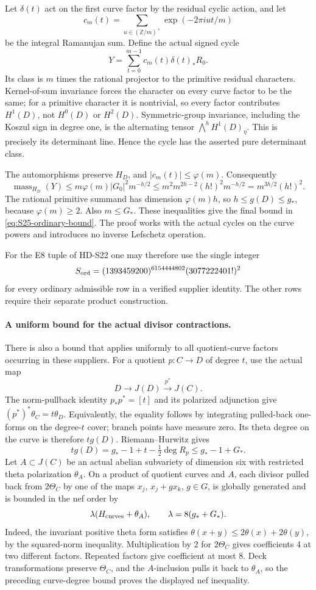 Let \(\delta(t)\) act on the first curve factor by the residual
cyclic action, and let
\[
 c_m(t)=\sum_{u\in(\mathbb Z/m)^\times}
              \exp(-2\pi iut/m)
\]
be the integral Ramanujan sum. Define the actual signed cycle
\[
 Y=\sum_{t=0}^{m-1}c_m(t)\delta(t)_*R_0.
\]
Its class is \(m\) times the rational projector to the primitive
residual characters. Kernel-of-sum invariance forces the character
on every curve factor to be the same; for a primitive character it
is nontrivial, so every factor contributes \(H^1(D)\), not
\(H^0(D)\) or \(H^2(D)\). Symmetric-group invariance, including
the Koszul sign in degree one, is the alternating tensor
\(\bigwedge^h H^1(D)_\eta\). This is precisely its determinant
line. Hence the cycle has the asserted pure determinant class.

The automorphisms preserve \(H_D\), and
\(|c_m(t)|\le\varphi(m)\). Consequently
\[
 \operatorname{mass}_{H_D}(Y)
 \le m\varphi(m)|G_0|^2m^{-h/2}
 \le m^2m^{2h-2}(h!)^2m^{-h/2}
 =m^{3h/2}(h!)^2.
\]
The rational primitive summand has dimension \(\varphi(m)h\), so
\(h\le g(D)\le g_*\), because \(\varphi(m)\ge2\).
Also \(m\le G_*\). These inequalities give the final bound in
\eqref{eq:S25-ordinary-bound}. The proof works with the actual cycles
on the curve powers and introduces no inverse Lefschetz operation.

For the E8 tuple of HD-S22 one may therefore use the single integer
\[
 S_{\rm ord}
 =(1393459200)^{6154444802}(3077222401!)^2
\]
for every ordinary admissible row in a verified supplier identity.
The other rows require their separate product construction.

\paragraph{A uniform bound for the actual divisor contractions.}
There is also a bound that applies uniformly to all quotient-curve
factors occurring in these suppliers. For a quotient \(p:C\to D\)
of degree \(t\), use the actual map
\[
 D\longrightarrow J(D)\xrightarrow{p^*}J(C).
\]
The norm-pullback identity \(p_*p^*=[t]\) and its polarized adjunction
give \((p^*)^*\theta_C=t\theta_D\). Equivalently, the equality
follows by integrating pulled-back one-forms on the degree-\(t\)
cover; branch points have measure zero. Its theta degree on the curve
is therefore \(t g(D)\). Riemann--Hurwitz gives
\[
 t g(D)=g_*-1+t-\tfrac12\deg R_p\le g_*-1+G_*.
\]
Let \(A\subset J(C)\) be an actual abelian subvariety of dimension
six with restricted theta polarization \(\theta_A\). On a product
of quotient curves and \(A\), each divisor pulled back from
\(2\Theta_C\) by one of the maps \(x_j\), \(x_j+g x_k\),
\(g\in G\), is globally generated and is bounded in the nef order
by
\[
 \lambda(H_{\rm curves}+\theta_A),\qquad
 \lambda=8(g_*+G_*).
\]
Indeed, the invariant positive theta form satisfies
\(\theta(x+y)\le2\theta(x)+2\theta(y)\), by the squared-norm
inequality. Multiplication by 2 for \(2\Theta_C\) gives coefficients
4 at two different factors. Repeated factors give coefficient at
most 8. Deck transformations preserve \(\Theta_C\), and the
\(A\)-inclusion pulls it back to \(\theta_A\), so the preceding
curve-degree bound proves the displayed nef inequality.

